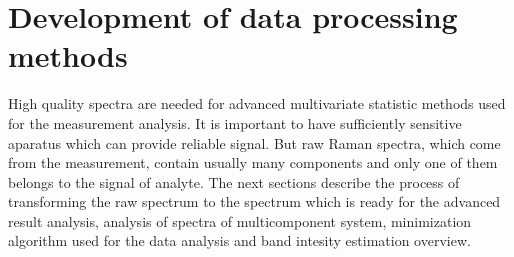 \section{Development of data processing methods}
\label{data_processing}

High quality spectra are needed for advanced multivariate statistic methods
used for the measurement analysis.
It is important to have sufficiently sensitive aparatus which can provide
reliable signal.
But raw Raman spectra, which come from the measurement, contain usually many
components and only one of them belongs to the signal of analyte.
The next sections describe the process of transforming the raw spectrum
to the spectrum which is ready for the advanced result analysis, analysis
of spectra of multicomponent system, minimization algorithm used for the
data analysis and band intesity estimation overview.







